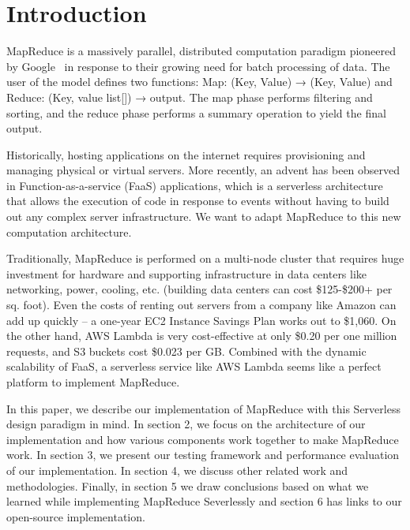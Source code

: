\section{Introduction}
\label{sec:introduction}

MapReduce is a massively parallel, distributed computation paradigm pioneered by Google~\cite{dean2004mapreduce} in response to their growing need for batch processing of data. The user of the model defines two functions: Map: (Key, Value) → (Key, Value) and Reduce: (Key, value list[]) → output. The map phase performs filtering and sorting, and the reduce phase performs a summary operation to yield the final output.

Historically, hosting applications on the internet requires provisioning and managing physical or virtual servers. More recently, an advent has been observed in Function-as-a-service (FaaS) applications, which is a serverless architecture that allows the execution of code in response to events without having to build out any complex server infrastructure. We want to adapt MapReduce to this new computation architecture.

Traditionally, MapReduce is performed on a multi-node cluster that requires huge investment for hardware and supporting infrastructure in data centers like networking, power, cooling, etc. (building data centers can cost \$125-\$200+ per sq. foot). Even the costs of renting out servers from a company like Amazon can add up quickly – a one-year EC2 Instance Savings Plan works out to \$1,060. On the other hand, AWS Lambda is very cost-effective at only \$0.20 per one million requests, and S3 buckets cost \$0.023 per GB. Combined with the dynamic scalability of FaaS, a serverless service like AWS Lambda seems like a perfect platform to implement MapReduce.

In this paper, we describe our implementation of MapReduce with this Serverless design paradigm in mind. In section 2, we focus on the architecture of our implementation and how various components work together to make MapReduce work. In section 3, we present our testing framework and performance evaluation of our implementation. In section 4, we discuss other related work and methodologies. Finally, in section 5 we draw conclusions based on what we learned while implementing MapReduce Severlessly and section 6 has links to our open-source implementation.